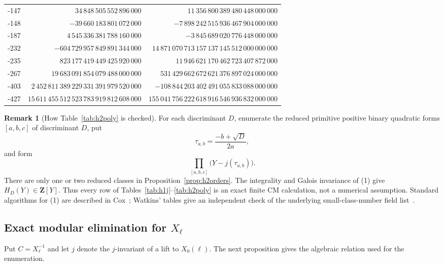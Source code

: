 \documentclass[11pt,a4paper]{amsart} %
\theoremstyle{definition}
\newtheorem{remark}[theorem]{Remark}
\begin{document}
\begin{longtable}{@{}r r r@{}}
-147 & \(34\,848\,505\,552\,896\,000\) & \(11\,356\,800\,389\,480\,448\,000\,000\) \\
-148 & \(-39\,660\,183\,801\,072\,000\) & \(-7\,898\,242\,515\,936\,467\,904\,000\,000\) \\
-187 & \(4\,545\,336\,381\,788\,160\,000\) & \(-3\,845\,689\,020\,776\,448\,000\,000\) \\
-232 & \(-604\,729\,957\,849\,891\,344\,000\) & \(14\,871\,070\,713\,157\,137\,145\,512\,000\,000\,000\) \\
-235 & \(823\,177\,419\,449\,425\,920\,000\) & \(11\,946\,621\,170\,462\,723\,407\,872\,000\) \\
-267 & \(19\,683\,091\,854\,079\,488\,000\,000\) & \(531\,429\,662\,672\,621\,376\,897\,024\,000\,000\) \\
-403 & \(2\,452\,811\,389\,229\,331\,391\,979\,520\,000\) & \(-108\,844\,203\,402\,491\,055\,833\,088\,000\,000\) \\
-427 & \(15\,611\,455\,512\,523\,783\,919\,812\,608\,000\) & \(155\,041\,756\,222\,618\,916\,546\,936\,832\,000\,000\) \\
\bottomrule
\end{longtable}
\endgroup

\begin{remark}[How Table~\ref{tab:h2poly} is checked]\label{rem:classpolycheck}
For each discriminant \(D\), enumerate the reduced primitive positive binary
quadratic forms \([a,b,c]\) of discriminant \(D\), put
\[
\tau_{a,b}=\frac{-b+\sqrt D}{2a},
\]
and form
\[
\prod_{[a,b,c]}\bigl(Y-j(\tau_{a,b})\bigr).
\tag{1}
\]
There are only one or two reduced classes in Proposition~\ref{prop:h2orders}.
The integrality and Galois invariance of (1) give \(H_D(Y)\in\mathbf Z[Y]\).
Thus every row of Tables~\ref{tab:h1j}--\ref{tab:h2poly} is an exact finite CM
calculation, not a numerical assumption. Standard algorithms for (1) are
described in Cox~\cite[Ch.~11]{Cox}; Watkins' tables give an independent check
of the underlying small-class-number field list~\cite{Watkins}.
\end{remark}

\subsection*{Exact modular elimination for \(X_\ell\)}

Put \(C=X_\ell^{-1}\) and let \(j\) denote the \(j\)-invariant of a lift to
\(X_0(\ell)\). The next proposition gives the algebraic relation used for the
enumeration.
\end{document}
